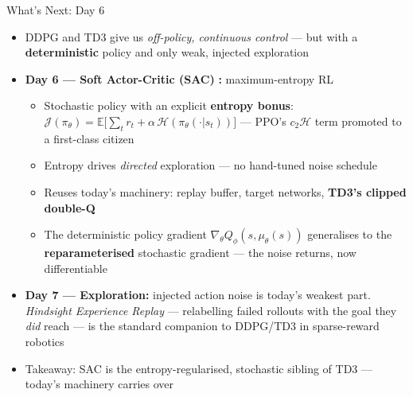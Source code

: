 \begin{frame}{What's Next: Day 6}
\begin{itemize}
    \item DDPG and TD3 give us \emph{off-policy, continuous control} --- but with a \textbf{deterministic} policy and only weak, injected exploration
    \pause
    \item \textbf{Day 6 --- Soft Actor-Critic (SAC)} \textbf{:} maximum-entropy RL
    \begin{itemize}
        \item Stochastic policy with an explicit \textbf{entropy bonus}: $\mathcal{J}(\pi_\theta) = \mathbb{E}\big[\sum_t r_t + \alpha\,\mathcal{H}(\pi_\theta(\cdot|s_t))\big]$ --- PPO's $c_2\mathcal{H}$ term promoted to a first-class citizen
        \item Entropy drives \emph{directed} exploration --- no hand-tuned noise schedule
        \item Reuses today's machinery: replay buffer, target networks, \textbf{TD3's clipped double-Q}
        \item The deterministic policy gradient $\nabla_\theta Q_\phi(s,\mu_\theta(s))$ generalises to the \textbf{reparameterised} stochastic gradient --- the noise returns, now differentiable
    \end{itemize}
    \item \textbf{Day 7 --- Exploration:} injected action noise is today's weakest part. \emph{Hindsight Experience Replay}  --- relabelling failed rollouts with the goal they \emph{did} reach --- is the standard companion to DDPG/TD3 in sparse-reward robotics
    \item Takeaway: SAC is the entropy-regularised, stochastic sibling of TD3 --- today's machinery carries over
\end{itemize}
\end{frame}
